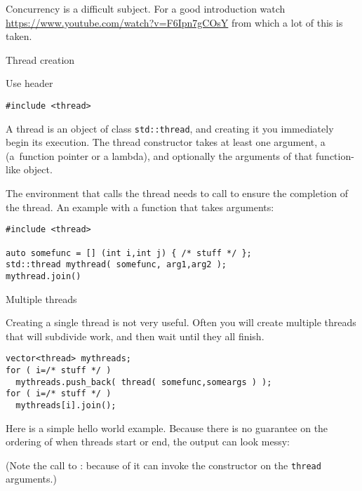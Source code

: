 
Concurrency is a difficult subject.
For a good introduction watch
\url{https://www.youtube.com/watch?v=F6Ipn7gCOsY}
from which a lot of this is taken.

 {Thread creation}
\label{sec:cpp-thread}

Use header
\begin{lstlisting}
#include <thread>
\end{lstlisting}

A thread is an object of class \lstinline+std::thread+,
and creating it you immediately begin its execution.
The thread constructor takes at least one argument,
a 
(a~function pointer or a lambda),
and optionally the arguments of that function-like object.

The environment that calls the thread needs to call 
to ensure the completion of the thread.
%
%
An example with a function that takes arguments:

\begin{lstlisting}
#include <thread>
  
auto somefunc = [] (int i,int j) { /* stuff */ };
std::thread mythread( somefunc, arg1,arg2 );
mythread.join()
\end{lstlisting}

 {Multiple threads}

Creating a single thread is not very useful.
Often you will create multiple threads
that will subdivide work,
and then wait until they all finish.
\begin{lstlisting}
vector<thread> mythreads;
for ( i=/* stuff */ )
  mythreads.push_back( thread( somefunc,someargs ) );
for ( i=/* stuff */ )
  mythreads[i].join();
\end{lstlisting}

Here is a simple hello world example.
Because there is no guarantee on the ordering of when threads
start or end, the output can look messy:
%

(Note the call to :
because of 
it can invoke the constructor on the \lstinline{thread} arguments.)

